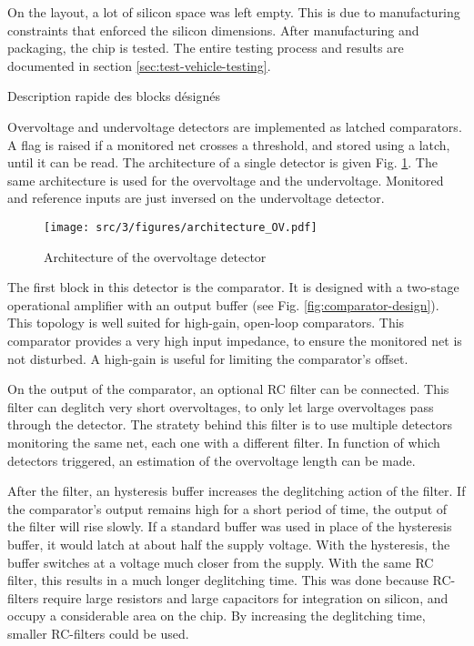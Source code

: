 On the layout, a lot of silicon space was left empty.
This is due to manufacturing constraints that enforced the silicon dimensions.
After manufacturing and packaging, the chip is tested.
The entire testing process and results are documented in section \ref{sec:test-vehicle-testing}.

Description rapide des blocks désignés

Overvoltage and undervoltage detectors are implemented as latched comparators.
A flag is raised if a monitored net crosses a threshold, and stored using a latch, until it can be read.
The architecture of a single detector is given Fig. \ref{fig:architecture-ov}.
The same architecture is used for the overvoltage and the undervoltage.
Monitored and reference inputs are just inversed on the undervoltage detector.

\begin{figure}[!h]
  \centering
  \texttt{[image: src/3/figures/architecture\_OV.pdf]}
  \caption{Architecture of the overvoltage detector}
  \label{fig:architecture-ov}
\end{figure}

The first block in this detector is the comparator.
It is designed with a two-stage operational amplifier with an output buffer (see Fig. \ref{fig:comparator-design}).
This topology is well suited for high-gain, open-loop comparators.
This comparator provides a very high input impedance, to ensure the monitored net is not disturbed.
A high-gain is useful for limiting the comparator's offset.


On the output of the comparator, an optional RC filter can be connected.
This filter can deglitch very short overvoltages, to only let large overvoltages pass through the detector.
The stratety behind this filter is to use multiple detectors monitoring the same net, each one with a different filter.
In function of which detectors triggered, an estimation of the overvoltage length can be made.

After the filter, an hysteresis buffer increases the deglitching action of the filter.
If the comparator's output remains high for a short period of time, the output of the filter will rise slowly.
If a standard buffer was used in place of the hysteresis buffer, it would latch at about half the supply voltage.
With the hysteresis, the buffer switches at a voltage much closer from the supply.
With the same RC filter, this results in a much longer deglitching time.
This was done because RC-filters require large resistors and large capacitors for integration on silicon, and occupy a considerable area on the chip.
By increasing the deglitching time, smaller RC-filters could be used.

